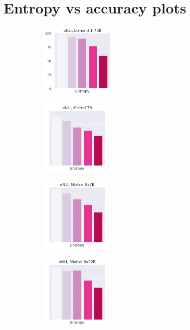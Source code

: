 

\section{Entropy vs accuracy plots}\label{app:entropy_vs_accuracy}

\begin{figure}[t]
    \centering
    \begin{subfigure}[b]{0.23\textwidth}
        \includegraphics[height=3.6cm]{figures/appendix/entropy_acc_abductivenli_70B}
    \end{subfigure}
    \begin{subfigure}[b]{0.23\textwidth}
        \includegraphics[height=3.6cm]{figures/appendix/entropy_acc_abductivenli_7B}
    \end{subfigure}
    \begin{subfigure}[b]{0.23\textwidth}
        \includegraphics[height=3.6cm]{figures/appendix/entropy_acc_abductivenli_8x7B}
    \end{subfigure}
    \begin{subfigure}[b]{0.23\textwidth}
        \includegraphics[height=3.6cm]{figures/appendix/entropy_acc_abductivenli_8x22B}

\end{subfigure}
\end{figure}
